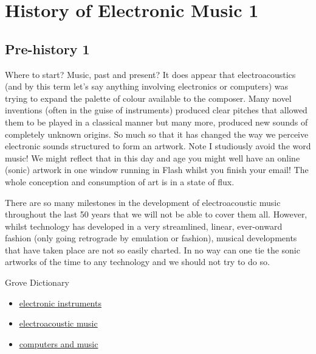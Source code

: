 
\chapter{History of Electronic Music 1}
\label{history1}

\section{Pre-history 1}
Where to start? Music, past and present? It does appear that electroacoustics (and by this term let's say anything involving electronics or computers) was trying to expand the palette of colour available to the composer. Many novel inventions (often in the guise of instruments) produced clear pitches that allowed them to be played in a classical manner but many more, produced new sounds of completely unknown origins. So much so that it has changed the way we perceive electronic sounds structured to form an artwork. Note I studiously avoid the word music! We might reflect that in this day and age you might well have an online (sonic) artwork in one window running in Flash whilst you finish your email! The whole conception and consumption of art is in a state of flux.

There are so many milestones in the development of electroacoustic music throughout the last 50 years that we will not be able to cover them all. However, whilst technology has developed in a very streamlined, linear, ever-onward fashion (only going retrograde by emulation or fashion), musical developments that have taken place are not so easily charted. In no way can one tie the sonic artworks of the time to any technology and we should not try to do so.

Grove Dictionary
\begin{itemize}
\item \href{http://www.grovemusic.com/shared/views/article.html?from=search&session_search_id=1011869954&session_name=e09647b5a66fbfeb&hitnum=1&section=music.08694&start=1&query=electronic%20instruments&search_subview=search_subject}{electronic instruments}
\item \href{http://www.grovemusic.com/shared/views/article.html?section=music.08695}{electroacoustic music}
\item \href{http://www.grovemusic.com/shared/views/article.html?section=music.40583}{computers and music}
\end{itemize}

